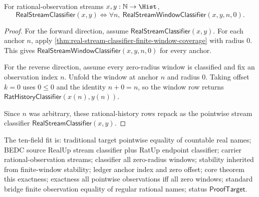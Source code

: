 \begin{theorem}
\label{thm:real-stream-classifier-zero-window-exactness}
For rational-observation streams $x,y:\mathbb{N}\to\Hist$,
$$
\mathsf{RealStreamClassifier}(x,y)
\Longleftrightarrow
\forall n,\ \mathsf{RealStreamWindowClassifier}(x,y,n,0).
$$
\end{theorem}
\begin{proof}
For the forward direction, assume $\mathsf{RealStreamClassifier}(x,y)$. For
each anchor $n$, apply
\autoref{thm:real-stream-classifier-finite-window-coverage} with radius $0$.
This gives $\mathsf{RealStreamWindowClassifier}(x,y,n,0)$ for every anchor.

For the reverse direction, assume every zero-radius window is classified and
fix an observation index $n$. Unfold the window at anchor $n$ and radius $0$.
Taking offset $k=0$ uses $0\le 0$ and the identity $n+0=n$, so the window row
returns $\mathsf{RatHistoryClassifier}(x(n),y(n))$.

Since $n$ was arbitrary, these rational-history rows repack as the pointwise
stream classifier $\mathsf{RealStreamClassifier}(x,y)$.
\end{proof}

The ten-field fit is: traditional target pointwise equality of countable real
names; BEDC source RealUp stream classifier plus RatUp endpoint classifier;
carrier rational-observation streams; classifier all zero-radius windows;
stability inherited from finite-window stability; ledger anchor index and zero
offset; core theorem this exactness; exactness all pointwise observations iff
all zero windows; standard bridge finite observation equality of regular
rational names; status $\mathsf{ProofTarget}$.

